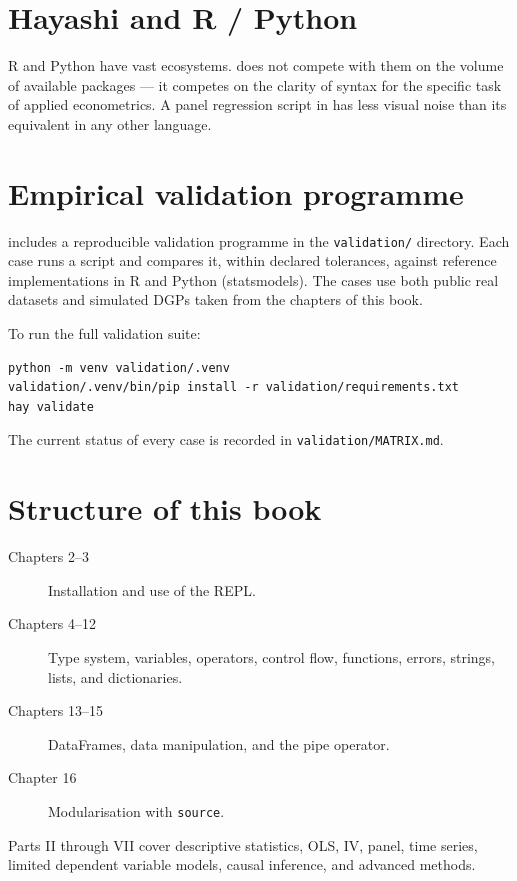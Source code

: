 \section{Hayashi and R / Python}

R and Python have vast ecosystems. \hayashi{} does not compete with them
on the volume of available packages — it competes on the clarity of syntax
for the specific task of applied econometrics. A panel regression script in
\hayashi{} has less visual noise than its equivalent in any other language.

\section{Empirical validation programme}

\hayashi{} includes a reproducible validation programme in the
\texttt{validation/} directory. Each case runs a \hayashi{} script and
compares it, within declared tolerances, against reference implementations in
R and Python (statsmodels). The cases use both public real datasets and
simulated DGPs taken from the chapters of this book.

To run the full validation suite:

\begin{lstlisting}[caption={Run the validation programme}]
python -m venv validation/.venv
validation/.venv/bin/pip install -r validation/requirements.txt
hay validate
\end{lstlisting}

The current status of every case is recorded in \texttt{validation/MATRIX.md}.

\section{Structure of this book}

\begin{description}
  \item[Chapters 2--3] Installation and use of the REPL.
  \item[Chapters 4--12] Type system, variables, operators, control flow,
        functions, errors, strings, lists, and dictionaries.
  \item[Chapters 13--15] DataFrames, data manipulation, and the pipe
        operator.
  \item[Chapter 16] Modularisation with \lstinline{source}.
\end{description}

Parts II through VII cover descriptive statistics, OLS, IV, panel,
time series, limited dependent variable models, causal inference, and
advanced methods.
